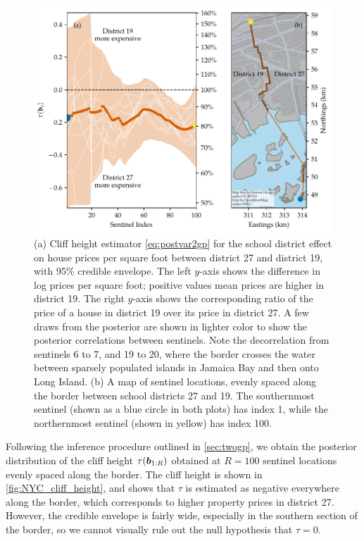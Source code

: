 \begin{figure}[tb]
    \centering
    \includegraphics[height=0.35\textheight]{figures/NYC_cliff_face.pdf}
    \caption{\label{fig:NYC_cliff_height}
        (a)
        Cliff height estimator \autoref{eq:postvar2gp} for the school district effect on house prices per square foot between district 27 and district 19, with 95\% credible envelope.
        The left \(y\)-axis shows the difference in log prices per square foot; positive values mean prices are higher in district 19.
        The right \(y\)-axis shows the corresponding ratio of the price of a house in district 19 over its price in district 27.
        A few draws from the posterior are shown in lighter color to show the posterior correlations between sentinels.
        Note the decorrelation from sentinels 6 to 7, and 19 to 20, where the border crosses the water between sparsely populated islands in Jamaica Bay and then onto Long Island.
        (b)
        A map of sentinel locations, evenly spaced along the border between school districts 27 and 19.
    	The southernmost sentinel (shown as a blue circle in both plots) has index 1, while the northernmost sentinel (shown in yellow) has index 100.
	}
\end{figure}

Following the inference procedure outlined in \autoref{sec:twogp}, we obtain the posterior distribution of the cliff height \(\tau(\bm{b}_{1:R})\) obtained at \(R=100\) sentinel locations evenly spaced along the border.
The cliff height is shown in \autoref{fig:NYC_cliff_height}, and shows that \(\tau\) is estimated as negative everywhere along the border, which corresponds to higher property prices in district 27.
However, the credible envelope is fairly wide, especially in the southern section of the border, so we cannot visually rule out the null hypothesis that \(\tau=0\).

